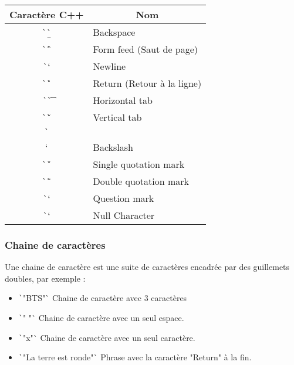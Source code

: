 \documentclass[10pt]{article}
\begin{document}
\begin{table}[H]
    \centering
    \begin{tabular}{|c|l|}
    \hline
    \textbf{Caractère C++}              & \multicolumn{1}{c|}{\textbf{Nom}} \\ \hline
    \texttt`\b`                & Backspace                \\ \hline
    \texttt`\f`                & Form feed (Saut de page) \\ \hline
    \texttt`\n`                & Newline                  \\ \hline
    \texttt`\r`                & Return (Retour à la ligne)\\ \hline
    \texttt`\t`                & Horizontal tab           \\ \hline
    \texttt`\v`                & Vertical tab             \\ \hline
    \texttt`\\`                & Backslash                \\ \hline
    \texttt`\'`                & Single quotation mark    \\ \hline
    \texttt`\"`                & Double quotation mark    \\ \hline
    \texttt`\?`                & Question mark            \\ \hline
    \texttt`\0`                & Null Character           \\ \hline
    \end{tabular}
\end{table}

\subsubsection{Chaine de caractères}
Une chaine de caractère est une suite de caractères encadrée par des guillemets doubles, par exemple : 

\begin{itemize}
    \item \texttt`"BTS"` Chaine de caractère avec 3 caractères
    \item \texttt`" "` Chaine de caractère avec un seul espace.
    \item \texttt`"x"` Chaine de caractère avec un seul caractère.
    \item \texttt`"La terre est ronde\n"` Phrase avec la caractère "Return" à la fin.
\end{itemize}
\end{document}
